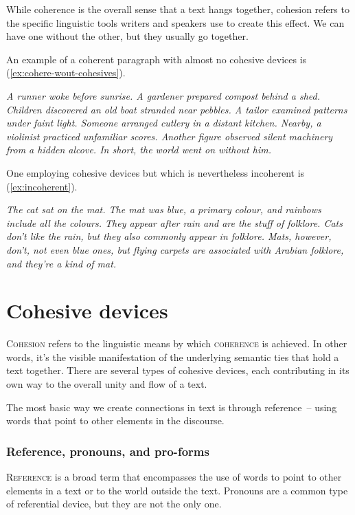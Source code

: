 While coherence is the overall sense that a text hangs together, cohesion refers to the specific linguistic tools writers and speakers use to create this effect. We can have one without the other, but they usually go together.

An example of a coherent paragraph with almost no cohesive devices is (\ref{ex:cohere-wout-cohesives}).

\ea \label{ex:cohere-wout-cohesives}
\textit{A runner woke before sunrise. A gardener prepared compost behind a shed. Children discovered an old boat stranded near pebbles. A tailor examined patterns under faint light. Someone arranged cutlery in a distant kitchen. Nearby, a violinist practiced unfamiliar scores. Another figure observed silent machinery from a hidden alcove. In short, the world went on without him.}
\z

\noindent One employing cohesive devices but which is nevertheless incoherent is (\ref{ex:incoherent}).

\ea \label{ex:incoherent}
\textit{The cat sat on the mat. The mat was blue, a primary colour, and rainbows include all the colours. They appear after rain and are the stuff of folklore. Cats don't like the rain, but they also commonly appear in folklore. Mats, however, don't, not even blue ones, but flying carpets are associated with Arabian folklore, and they're a kind of mat.}
\z
{}

\section{Cohesive devices}

\textsc{Cohesion} refers to the linguistic means by which \textsc{coherence} is achieved. In other words, it's the visible manifestation of the underlying semantic ties that hold a text together. There are several types of cohesive devices, each contributing in its own way to the overall unity and flow of a text.

The most basic way we create connections in text is through reference~-- using words that point to other elements in the discourse.

\subsubsection*{Reference, pronouns, and pro-forms}

\textsc{Reference} is a broad term that encompasses the use of words to point to other elements in a text or to the world outside the text. Pronouns are a common type of referential device, but they are not the only one.

